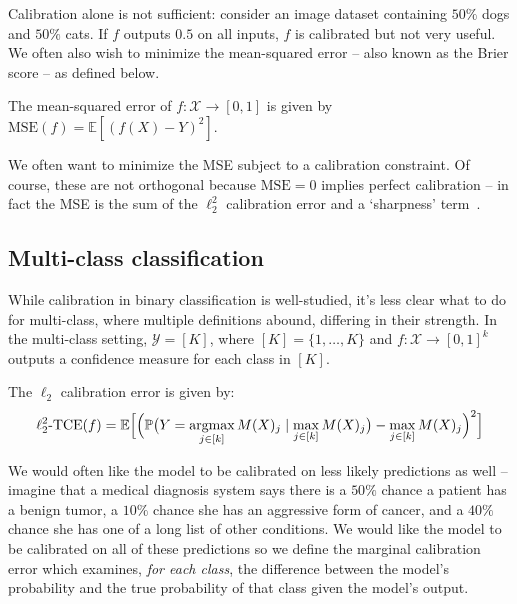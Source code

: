 Calibration alone is not sufficient: consider an image dataset containing $50\%$ dogs and $50\%$ cats.
If $f$ outputs $0.5$ on all inputs, $f$ is calibrated but not very useful.
We often also wish to minimize the mean-squared error -- also known as the Brier score -- as defined below.

\begin{definition}
The mean-squared error of $f : \mathcal{X} \to [0, 1]$ is given by $\mbox{MSE}(f) = \mathbb{E}[(f(X) - Y)^2]$.
\end{definition}

We often want to minimize the MSE subject to a calibration constraint. Of course, these are not orthogonal because $\mbox{MSE} = 0$ implies perfect calibration -- in fact the MSE is the sum of the $\ell_2^2$ calibration error and a `sharpness' term~\cite{murphy1973vector,degroot1983forecasters, kuleshov2015calibrated}.

\subsection{Multi-class classification}

While calibration in binary classification is well-studied,
it's less clear what to do for multi-class, where multiple definitions abound, differing in their strength. In the multi-class setting, $\mathcal{Y} = [K]$, where $[K] = \{1, \dots, K\}$ and $f : \mathcal{X} \to [0, 1]^k$ outputs a confidence measure for each class in $[K]$.

\begin{definition}
The $\ell_2$ calibration error is given by:
\begin{align}
\ell_2^2\mbox{-TCE}(f) = \mathbb{E}\Big[ \Big( \mathbb{P}\big(Y = \mathop{\mbox{argmax}}_{j \in [k]} M(X)_j \mid \max_{j \in [k]} M(X)_j\big) - \max_{j \in [k]} M(X)_j \Big)^2 \Big]
\end{align}
\end{definition}

We would often like the model to be calibrated on less likely predictions as well -- imagine that a medical diagnosis system says there is a $50\%$ chance a patient has a benign tumor, a $10\%$ chance she has an aggressive form of cancer, and a $40\%$ chance she has one of a long list of other conditions. We would like the model to be calibrated on all of these predictions so we define the marginal calibration error which examines, \emph{for each class}, the difference between the model's probability and the true probability of that class given the model's output.

